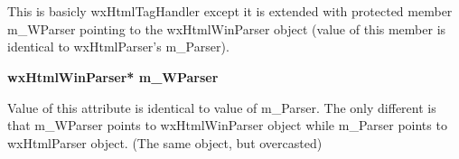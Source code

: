 %
%


\section{}\label{wxhtmlwintaghandler}

This is basicly wxHtmlTagHandler except
it is extended with protected member m\_WParser pointing to
the wxHtmlWinParser object (value of this member is identical
to wxHtmlParser's m\_Parser).







\label{wxhtmlwintaghandlerwxhtmlwintaghandlermwparser}

{\bf wxHtmlWinParser* m\_WParser}

Value of this attribute is identical to value of m\_Parser. The only different
is that m\_WParser points to wxHtmlWinParser object while m\_Parser
points to wxHtmlParser object.
(The same object, but overcasted)


